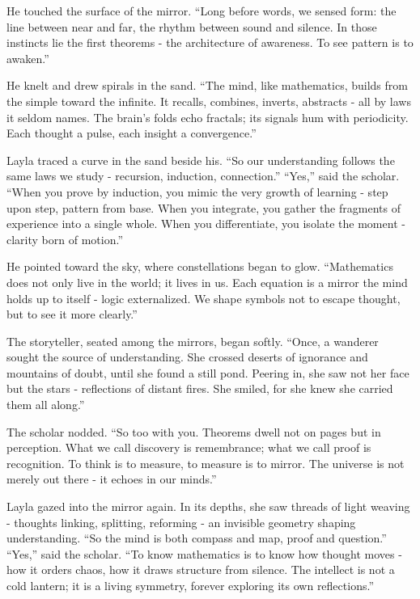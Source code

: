 \documentclass[
  letterpaper,
  DIV=11,
  numbers=noendperiod]{scrreprt}
\begin{document}
He touched the surface of the mirror. ``Long before words, we sensed
form: the line between near and far, the rhythm between sound and
silence. In those instincts lie the first theorems - the architecture of
awareness. To see pattern is to awaken.''

He knelt and drew spirals in the sand. ``The mind, like mathematics,
builds from the simple toward the infinite. It recalls, combines,
inverts, abstracts - all by laws it seldom names. The brain's folds echo
fractals; its signals hum with periodicity. Each thought a pulse, each
insight a convergence.''

Layla traced a curve in the sand beside his. ``So our understanding
follows the same laws we study - recursion, induction, connection.''
``Yes,'' said the scholar. ``When you prove by induction, you mimic the
very growth of learning - step upon step, pattern from base. When you
integrate, you gather the fragments of experience into a single whole.
When you differentiate, you isolate the moment - clarity born of
motion.''

He pointed toward the sky, where constellations began to glow.
``Mathematics does not only live in the world; it lives in us. Each
equation is a mirror the mind holds up to itself - logic externalized.
We shape symbols not to escape thought, but to see it more clearly.''

The storyteller, seated among the mirrors, began softly. ``Once, a
wanderer sought the source of understanding. She crossed deserts of
ignorance and mountains of doubt, until she found a still pond. Peering
in, she saw not her face but the stars - reflections of distant fires.
She smiled, for she knew she carried them all along.''

The scholar nodded. ``So too with you. Theorems dwell not on pages but
in perception. What we call discovery is remembrance; what we call proof
is recognition. To think is to measure, to measure is to mirror. The
universe is not merely out there - it echoes in our minds.''

Layla gazed into the mirror again. In its depths, she saw threads of
light weaving - thoughts linking, splitting, reforming - an invisible
geometry shaping understanding. ``So the mind is both compass and map,
proof and question.'' ``Yes,'' said the scholar. ``To know mathematics
is to know how thought moves - how it orders chaos, how it draws
structure from silence. The intellect is not a cold lantern; it is a
living symmetry, forever exploring its own reflections.''
\end{document}
